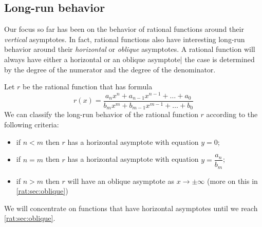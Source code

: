  \subsection*{Long-run behavior}
	 Our focus so far has been on the behavior of rational functions around
	 their \emph{vertical} asymptotes. In fact, rational functions also
	 have interesting long-run behavior around their \emph{horizontal} or
	 \emph{oblique} asymptotes. A rational function will always have either
	 a horizontal or an oblique asymptote| the case is determined by the degree
	 of the numerator and the degree of the denominator.
	 \begin{pccdefinition}\label{rat:def:longrun}
		 Let $r$ be the rational function that has formula
		 \[
			 r(x) = \frac{a_n x^n + a_{n-1}x^{n-1}+\ldots + a_0}{b_m x^m + b_{m-1}x^{m-1}+\ldots+b_0}
		 \]
		 We can classify the long-run behavior of the rational function $r$
		 according to the following criteria:
		 \begin{itemize}
			 \item if $n<m$ then  $r$ has a horizontal asymptote with equation $y=0$;
			 \item if $n=m$ then $r$ has a horizontal asymptote with equation $y=\dfrac{a_n}{b_m}$;
			 \item if $n>m$ then $r$ will have an oblique asymptote as $x\rightarrow\pm\infty$ (more on this in \cref{rat:sec:oblique})
		 \end{itemize}
	 \end{pccdefinition}
	 We will concentrate on functions that have horizontal asymptotes until
	 we reach \cref{rat:sec:oblique}.

